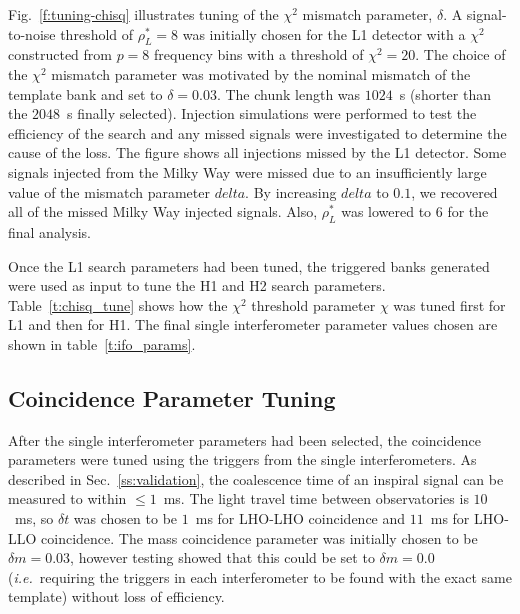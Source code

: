 Fig.~\ref{f:tuning-chisq} illustrates tuning of the $\chi^2$ mismatch parameter,
$\delta$. A signal-to-noise threshold of $\rho^\ast_L = 8$ was initially chosen
for the L1 detector with a $\chi^2$ constructed from $p = 8$ frequency bins
with a threshold of $\chi^2 = 20$. The choice of the $\chi^2$ mismatch
parameter was motivated by the nominal mismatch of the template bank and set to
$\delta = 0.03$. The chunk length was $1024$~s
(shorter than the $2048$~s finally selected). Injection simulations were
performed to test the efficiency of the search and any missed signals were
investigated to determine the cause of the loss. The figure shows all
injections missed by the L1 detector. Some signals injected from the Milky Way
were missed due to an insufficiently large value of the mismatch
parameter $delta$. By increasing $delta$ to $0.1$, we recovered all of
the missed Milky Way injected
signals.  Also, $\rho^\ast_L$ was lowered to 6 for the final analysis.

Once the L1 search parameters had been tuned, the triggered banks generated
were used as input to tune the H1 and H2 search parameters.
Table~\ref{t:chisq_tune} shows how the $\chi^2$ threshold parameter
$\chi$ was tuned first for L1 and then for H1. The final single
interferometer parameter values chosen are shown in
table~\ref{t:ifo_params}.

\subsection{Coincidence Parameter Tuning}
\label{ss:coinc_tuning}

After the single interferometer parameters had been selected, the coincidence
parameters were tuned using the triggers from the single interferometers.
As described in Sec.~\ref{ss:validation}, the coalescence time of
an inspiral signal can be measured to within $\le1$~ms. The light travel time
between observatories is $10$~ms, so $\delta t$ was chosen to be $1$~ms for
LHO-LHO coincidence and $11$~ms for LHO-LLO coincidence. The mass coincidence
parameter was initially chosen to be $\delta m = 0.03$, however testing showed
that this could be set to $\delta m = 0.0$ ({\it i.e.}\ requiring the
triggers in each interferometer to be found with the exact same
template) without loss of efficiency.

